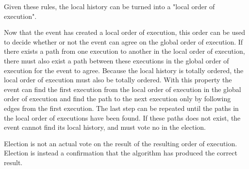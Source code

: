 	
	\newpar	Given these rules, the local history can be turned into a "local order of execution".
	
	\newpar Now that the event has created a local order of execution, this order can be used to decide whether or not the event can agree on the global order of execution. If there exists a path from one execution to another in the local order of execution, there must also exist a path between these executions in the global order of execution for the event to agree. Because the local history is totally ordered, the local order of execution must also be totally ordered. With this property the event can find the first execution from the local order of execution in the global order of execution and find the path to the next execution only by following edges from the first execution. The last step can be repeated until the paths in the local order of executions have been found. If these paths does not exist, the event cannot find its local history, and must vote no in the election.
	
	\newpar Election is not an actual vote on the result of the resulting order of execution. Election is instead a confirmation that the algorithm has produced the correct result. 
	
